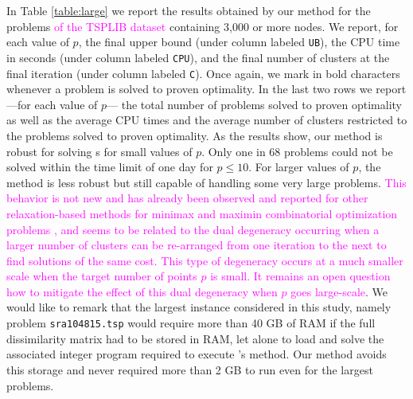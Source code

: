 \documentclass[ijoo,nonblindrev]{informs-ijoo}
\begin{document}
In Table \ref{table:large} we report the results obtained by our method for the problems \textcolor{magenta}{of the TSPLIB dataset} containing 3,000 or more nodes. We report, for each value of $p$, the final upper bound (under column labeled \texttt{UB}), the CPU time in seconds (under column labeled \texttt{CPU}), and the final number of clusters at the final iteration (under column labeled \texttt{C}). Once again, we mark in bold characters whenever a problem is solved to proven optimality. In the last two rows we report ---for each value of $p$--- the total number of problems solved to proven optimality as well as the average CPU times and the average number of clusters restricted to the problems solved to proven optimality. As the results show, our method is robust for solving \pDP{}s for small values of $p$. Only one in 68 problems could not be solved within the time limit of one day for $p\leq 10$. For larger values of $p$, the method is less robust but still capable of handling some very large problems. \textcolor{magenta}{This behavior is not new and has already been observed and reported for other relaxation-based methods for minimax and maximin combinatorial optimization problems \citep{Aloise2018sampling, Contardo2019scalable}, and seems to be related to the dual degeneracy occurring when a larger number of clusters can be re-arranged from one iteration to the next to find solutions of the same cost. This type of degeneracy occurs at a much smaller scale when the target number of points $p$ is small. It remains an open question how to mitigate the effect of this dual degeneracy when $p$ goes large-scale}. We would like to remark that the largest instance considered in this study, namely problem \texttt{sra104815.tsp} would require more than 40 GB of RAM if the full dissimilarity matrix had to be stored in RAM, let alone to load and solve the associated integer program required to execute \citeauthor{Sayah2017new}'s method. Our method avoids this storage and never required more than 2 GB to run even for the largest problems.
\end{document}
